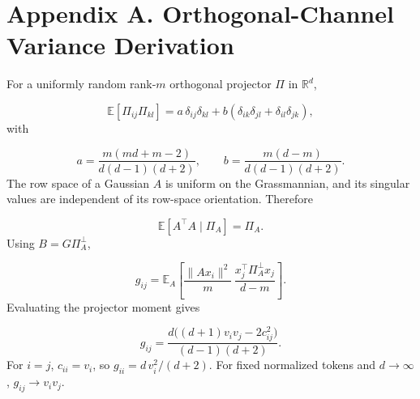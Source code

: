 \documentclass[11pt,letterpaper]{article}
\theoremstyle{definition}
\begin{document}
\appendix
\section{Appendix A. Orthogonal-Channel Variance Derivation}
For a uniformly random rank-$m$ orthogonal projector $\Pi$ in $\mathbb R^d$,

\[
\mathbb E[\Pi_{ij}\Pi_{kl}]
=a\,\delta_{ij}\delta_{kl}
+b(\delta_{ik}\delta_{jl}+\delta_{il}\delta_{jk}),
\]
with

\[
a=\frac{m(md+m-2)}{d(d-1)(d+2)},\qquad
b=\frac{m(d-m)}{d(d-1)(d+2)}.
\]
The row space of a Gaussian $A$ is uniform on the Grassmannian, and its singular values are independent of its row-space orientation. Therefore

\[
\mathbb E[A^\top A\mid\Pi_A]=\Pi_A.
\]
Using $B=G\Pi_A^\perp$,

\[
g_{ij}
=\mathbb E_A\left[
\frac{\|Ax_i\|^2}{m}\,
\frac{x_j^\top\Pi_A^\perp x_j}{d-m}
\right].
\]
Evaluating the projector moment gives

\[
g_{ij}
=\frac{d\big((d+1)v_iv_j-2c_{ij}^2\big)}
{(d-1)(d+2)}.
\]
For $i=j$, $c_{ii}=v_i$, so $g_{ii}=d\,v_i^2/(d+2)$. For fixed normalized tokens and $d\to\infty$, $g_{ij}\to v_iv_j$.
\end{document}

